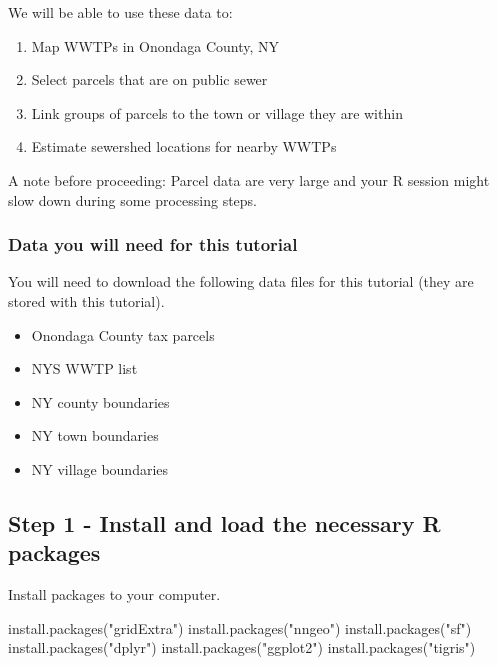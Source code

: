 \documentclass[
]{book}
\newenvironment{Shaded}{\begin{snugshade}}{\end{snugshade}}
\newcommand{\FunctionTok}[1]{\textcolor[rgb]{0.00,0.00,0.00}{#1}}
\newcommand{\NormalTok}[1]{#1}
\newcommand{\StringTok}[1]{\textcolor[rgb]{0.31,0.60,0.02}{#1}}
\begin{document}
We will be able to use these data to:

\begin{enumerate}
\def\labelenumi{\arabic{enumi})}
\item
  Map WWTPs in Onondaga County, NY
\item
  Select parcels that are on public sewer
\item
  Link groups of parcels to the town or village they are within
\item
  Estimate sewershed locations for nearby WWTPs
\end{enumerate}

A note before proceeding: Parcel data are very large and your R session might slow down during some processing steps.

\hypertarget{data-you-will-need-for-this-tutorial}{%
\subsubsection{Data you will need for this tutorial}\label{data-you-will-need-for-this-tutorial}}

You will need to download the following data files for this tutorial (they are stored with this tutorial).

\begin{itemize}
\item
  Onondaga County tax parcels
\item
  NYS WWTP list
\item
  NY county boundaries
\item
  NY town boundaries
\item
  NY village boundaries
\end{itemize}

\hypertarget{step-1---install-and-load-the-necessary-r-packages}{%
\subsection{Step 1 - Install and load the necessary R packages}\label{step-1---install-and-load-the-necessary-r-packages}}

Install packages to your computer.

\begin{Shaded}
\begin{Highlighting}[]
\FunctionTok{install.packages}\NormalTok{(}\StringTok{"gridExtra"}\NormalTok{)}
\FunctionTok{install.packages}\NormalTok{(}\StringTok{"nngeo"}\NormalTok{)}
\FunctionTok{install.packages}\NormalTok{(}\StringTok{"sf"}\NormalTok{)}
\FunctionTok{install.packages}\NormalTok{(}\StringTok{"dplyr"}\NormalTok{)}
\FunctionTok{install.packages}\NormalTok{(}\StringTok{"ggplot2"}\NormalTok{)}
\FunctionTok{install.packages}\NormalTok{(}\StringTok{"tigris"}\NormalTok{)}
\end{Highlighting}
\end{Shaded}
\end{document}
